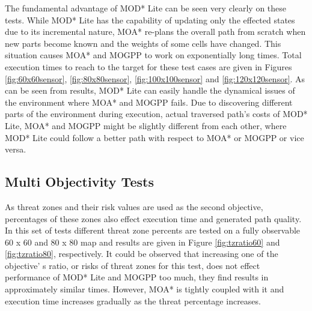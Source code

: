 The fundamental advantage of MOD* Lite can be seen very clearly on these tests. While MOD* Lite has the capability of updating only the effected states due to its incremental nature, MOA* re-plans the overall path from scratch when new parts become known and the weights of some cells have changed. This situation causes MOA* and MOGPP to work on exponentially long times. Total execution times to reach to the target for these test cases are given in Figures \ref{fig:60x60sensor}, \ref{fig:80x80sensor}, \ref{fig:100x100sensor} and \ref{fig:120x120sensor}. As can be seen from results, MOD* Lite can easily handle the dynamical issues of the environment where MOA* and MOGPP fails. Due to discovering different parts of the environment during execution, actual traversed path's costs of MOD* Lite, MOA* and MOGPP might be slightly different from each other, where MOD* Lite could follow a better path with respect to MOA* or MOGPP or vice versa.

\subsection{Multi Objectivity Tests}

As threat zones and their risk values are used as the second objective, percentages of these zones also effect execution time and generated path quality. In this set of tests different threat zone percents are tested on a fully observable 60 x 60 and 80 x 80 map and results are given in Figure \ref{fig:tzratio60} and \ref{fig:tzratio80}, respectively. It could be observed that increasing one of the objective' s ratio, or risks of threat zones for this test, does not effect performance of  MOD* Lite and MOGPP too much, they find results in approximately similar times. However, MOA* is tightly coupled with it and execution time increases gradually as the threat percentage increases.